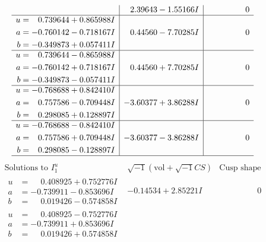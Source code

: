 \documentclass[1p]{elsarticle_modified}
\theoremstyle{definition}
\newcommand{\I}{\sqrt{-1}}
\begin{document}
$$\begin{array}{c|c|c}
 & \phantom{-}2.39643 - 1.55166 I & \phantom{-0.000000 } 0 \\ \hline\begin{aligned}
u &= \phantom{-}0.739644 + 0.865988 I \\
a &= -0.760142 - 0.718167 I \\
b &= -0.349873 + 0.057411 I\end{aligned}
 & \phantom{-}0.44560 - 7.70285 I & \phantom{-0.000000 } 0 \\ \hline\begin{aligned}
u &= \phantom{-}0.739644 - 0.865988 I \\
a &= -0.760142 + 0.718167 I \\
b &= -0.349873 - 0.057411 I\end{aligned}
 & \phantom{-}0.44560 + 7.70285 I & \phantom{-0.000000 } 0 \\ \hline\begin{aligned}
u &= -0.768688 + 0.842410 I \\
a &= \phantom{-}0.757586 - 0.709448 I \\
b &= \phantom{-}0.298085 + 0.128897 I\end{aligned}
 & -3.60377 + 3.86288 I & \phantom{-0.000000 } 0 \\ \hline\begin{aligned}
u &= -0.768688 - 0.842410 I \\
a &= \phantom{-}0.757586 + 0.709448 I \\
b &= \phantom{-}0.298085 - 0.128897 I\end{aligned}
 & -3.60377 - 3.86288 I & \phantom{-0.000000 } 0\\
 \hline 
 \end{array}$$\newpage$$\begin{array}{c|c|c}  
\text{Solutions to }I^u_{1}& \I (\text{vol} + \sqrt{-1}CS) & \text{Cusp shape}\\
 \hline 
\begin{aligned}
u &= \phantom{-}0.408925 + 0.752776 I \\
a &= -0.739911 - 0.853696 I \\
b &= \phantom{-}0.019426 - 0.574858 I\end{aligned}
 & -0.14534 + 2.85221 I & \phantom{-0.000000 } 0 \\ \hline\begin{aligned}
u &= \phantom{-}0.408925 - 0.752776 I \\
a &= -0.739911 + 0.853696 I \\
b &= \phantom{-}0.019426 + 0.574858 I\end{aligned}

\end{array}$$
\end{document}
